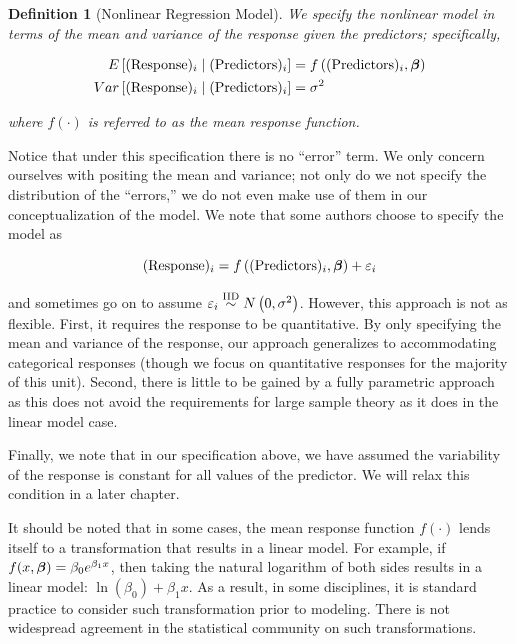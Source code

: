 \documentclass[
]{book}
\theoremstyle{plain}
\theoremstyle{mydefn}
\newtheorem{definition}{Definition}[chapter]
\theoremstyle{myexmpl}
\theoremstyle{remark}
\begin{document}
\begin{definition}[Nonlinear Regression Model]
\protect\hypertarget{def:defn-nlm-model}{}{\label{def:defn-nlm-model} {} }We specify the nonlinear model in terms of the \emph{mean} and \emph{variance} of the response given the predictors; specifically,

\[
\begin{aligned}
  E\left[(\text{Response})_i \mid (\text{Predictors})_i\right] 
    &= f\left((\text{Predictors})_i, \boldsymbol{\beta}\right) \\
  Var\left[(\text{Response})_i \mid (\text{Predictors})_i\right]
    &= \sigma^2
\end{aligned}
\]

where \(f(\cdot)\) is referred to as the mean response function.
\end{definition}

Notice that under this specification there is no ``error'' term. We only concern ourselves with positing the mean and variance; not only do we not specify the distribution of the ``errors,'' we do not even make use of them in our conceptualization of the model. We note that some authors choose to specify the model as

\[(\text{Response})_i = f\left((\text{Predictors})_i, \boldsymbol{\beta}\right) + \varepsilon_i\]

and sometimes go on to assume \(\varepsilon_i \stackrel{\text{IID}}{\sim} N\left(0, \sigma^2\right)\). However, this approach is not as flexible. First, it requires the response to be quantitative. By only specifying the mean and variance of the response, our approach generalizes to accommodating categorical responses (though we focus on quantitative responses for the majority of this unit). Second, there is little to be gained by a fully parametric approach as this does not avoid the requirements for large sample theory as it does in the linear model case.

Finally, we note that in our specification above, we have assumed the variability of the response is constant for all values of the predictor. We will relax this condition in a later chapter.

It should be noted that in some cases, the mean response function \(f(\cdot)\) lends itself to a transformation that results in a linear model. For example, if \(f(x, \boldsymbol{\beta}) = \beta_0 e^{\beta_1 x}\), then taking the natural logarithm of both sides results in a linear model: \(\ln\left(\beta_0\right) + \beta_1 x\). As a result, in some disciplines, it is standard practice to consider such transformation prior to modeling. There is not widespread agreement in the statistical community on such transformations.
\end{document}
